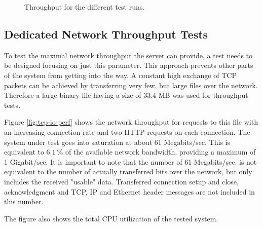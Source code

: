 \begin{figure}[H]
	\centering
  \caption{Throughput for the different test runs.}
  \label{fig:initial-req-io}
\end{figure}

\subsection{Dedicated Network Throughput Tests}

To test the maximal network throughput the server can provide, a test needs to be designed focusing on just this parameter. This approach prevents other parts of the system from getting into the way. A constant high exchange of TCP packets can be achieved by transferring very few, but large files over the network. Therefore a large binary file having a size of 33.4 MB was used for throughput tests.

Figure \ref{fig:tcp-io-perf} shows the network throughput for requests to this file with an increasing connection rate and two HTTP requests on each connection. The system under test goes into saturation at about 61 Megabits/sec. This is equivalent to $6.1\ \%$ of the available network bandwidth, providing a maximum of 1 Gigabit/sec. It is important to note that the number of 61 Megabits/sec. is not equivalent to the number of actually transferred bits over the network, but only includes the received "usable" data. Transferred connection setup and close, acknowledgment and TCP, IP and Ethernet header messages are not included in this number.

The figure also shows the total CPU utilization of the tested system.

